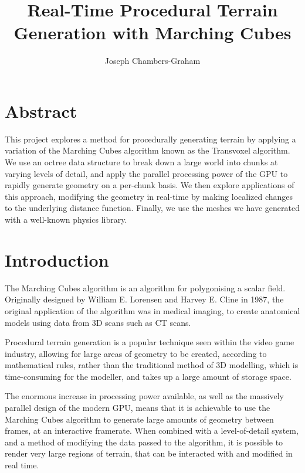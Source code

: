 \documentclass{article}
\title{Real-Time Procedural Terrain Generation with Marching Cubes}
\author{Joseph Chambers-Graham}
\date{}
\begin{document}


\maketitle
\newpage

\section*{Abstract}
This project explores a method for procedurally generating terrain by applying a variation of the Marching Cubes algorithm known as the Transvoxel algorithm. We use an octree data structure to break down a large world into chunks at varying levels of detail, and apply the parallel processing power of the GPU to rapidly generate geometry on a per-chunk basis. We then explore applications of this approach, modifying the geometry in real-time by making localized changes to the underlying distance function. %
Finally, we use the meshes we have generated with a well-known physics library.
\newpage

\tableofcontents

\newpage
\section{Introduction}


The Marching Cubes algorithm is an algorithm for polygonising a scalar field. Originally designed by William E. Lorensen and Harvey E. Cline in 1987\cite{10.1145/37402.37422}, the original application of the algorithm was in medical imaging, to create anatomical models using data from 3D scans such as CT scans. %
 
Procedural terrain generation is a popular technique seen within the video game industry, allowing for large areas of geometry to be created, according to mathematical rules, rather than the traditional method of 3D modelling, which is time-consuming for the modeller, and takes up a large amount of storage space.

The enormous increase in processing power available, as well as the massively parallel design of the modern GPU, means that it is achievable to use the Marching Cubes algorithm to generate large amounts of geometry between frames, at an interactive framerate. When combined with a level-of-detail system, and a method of modifying the data passed to the algorithm, it is possible to render very large regions of terrain, that can be interacted with and modified in real time.
\end{document}

